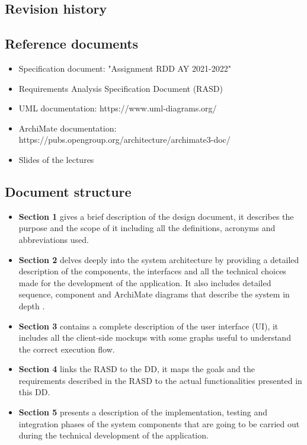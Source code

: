 \documentclass[table, 12pt]{article}
\begin{document}
\subsection{Revision history}

\subsection{Reference documents}
\begin{itemize}
    \item Specification document: "Assignment RDD AY 2021-2022"
    \item Requirements Analysis Specification Document (RASD)
    \item UML documentation: https://www.uml-diagrams.org/
    \item ArchiMate documentation: https://pubs.opengroup.org/architecture/archimate3-doc/
    \item Slides of the lectures
\end{itemize}
\subsection{Document structure}
\begin{itemize}
    \item \textbf{Section 1} gives a brief description of the design document, it describes the purpose and the scope of it including all the definitions, acronyms and abbreviations used. 
    \item \textbf{Section 2} delves deeply into the system architecture by providing a detailed description of the components, the interfaces and all the technical choices made for the development of the application.
    It also includes detailed sequence, component and ArchiMate diagrams that describe the system in depth .
    \item \textbf{Section 3} contains a complete description of the user interface (UI), it includes all the client-side mockups with some graphs useful to understand the correct execution flow.
    \item \textbf{Section 4} links the RASD to the DD, it maps the goals and the requirements described in the RASD to the actual functionalities presented in this DD.
    \item \textbf{Section 5} presents a description of the implementation, testing and integration phases of the system components that are going to be carried out during the technical development of the application.
\end{itemize}
\end{document}

